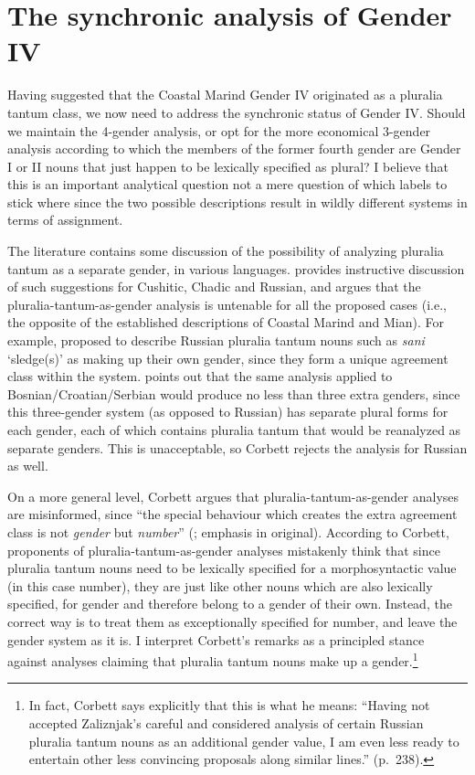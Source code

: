 \documentclass[output=collectionpaper]{langsci/langscibook}
\begin{document}
\section{The synchronic analysis of Gender IV}
\label{sec:Bruno:Mar-synchrony}

Having suggested that the Coastal Marind Gender IV originated as a pluralia tantum class, we now need to address the synchronic status of Gender IV. Should we maintain the 4-gender analysis, or opt for the more economical 3-gender analysis according to which the members of the former fourth gender are Gender I or II nouns that just happen to be lexically specified as plural? I believe that this is an important analytical question \textendash{} not a mere question of which labels to stick where \textendash{} since the two possible descriptions result in wildly different systems in terms of assignment.

The literature contains some discussion of the possibility of analyzing pluralia tantum as a separate gender, in various languages. \cite[233--239]{Corbett2012} provides instructive discussion of such suggestions for Cushitic, Chadic and Russian, and argues that the pluralia-tantum-as-gender analysis is untenable for all the proposed cases (i.e., the opposite of the established descriptions of Coastal Marind and Mian). For example, \cite{Zaliznjak1964} proposed to describe Russian pluralia tantum nouns such as \emph{sani} `sledge(s)' as making up their own gender, since they form a unique agreement class within the system. \cite[237--238]{Corbett2012} points out that the same analysis applied to Bosnian/Croatian/Serbian would produce no less than three extra genders, since this three-gender system (as opposed to Russian) has separate plural forms for each gender, each of which contains pluralia tantum that would be reanalyzed as separate genders. This is unacceptable, so Corbett rejects the analysis for Russian as well.

On a more general level, Corbett argues that pluralia-tantum-as-gender analyses are misinformed, since ``the special behaviour which creates the extra agreement class is not \emph{gender} but \emph{number}'' (\citealt[238]{Corbett2012}; emphasis in original). According to Corbett, proponents of pluralia-tantum-as-gender analyses mistakenly think that since pluralia tantum nouns need to be lexically specified for a morphosyntactic value (in this case number), they are just like other nouns \textendash{} which are also lexically specified, for gender \textendash{} and therefore belong to a gender of their own. Instead, the correct way is to treat them as exceptionally specified for number, and leave the gender system as it is. I interpret Corbett's remarks as a principled stance against analyses claiming that pluralia tantum nouns make up a gender.\footnote{In fact, Corbett says explicitly that this is what he means: ``Having not accepted Zaliznjak's careful and considered analysis of certain Russian pluralia tantum nouns as an additional gender value, I am even less ready to entertain other less convincing proposals along similar lines.'' (p.~238).}
\end{document}
